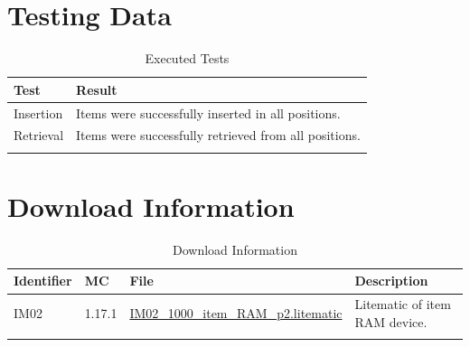 \documentclass[10pt]{datasheet}
\begin{document}
\section{Testing Data}

\begin{table}[h]
\caption{Executed Tests}
\begin{tabularx}{\textwidth}{l | X}
    \thickhline
    \textbf{Test} & \textbf{Result} \\
    \hline
    Insertion & Items were successfully inserted in all positions. \\
    \hline
    Retrieval & Items were successfully retrieved from all positions. \\
    \thickhline
\end{tabularx}
\end{table}

\section{Download Information}
\begin{table}[h]
    \caption{Download Information}
    \begin{tabularx}{\textwidth}{l | l | l | X}
        \thickhline
        \textbf{Identifier} & \textbf{MC} & \textbf{File} & \textbf{Description} \\
        \hline
        IM02 & 1.17.1 & \href{https://github.com/Soontech-Annals/Archive/blob/92d3541e07ddc3ab90360e923907f040eca76834/Archive/item-memory/IM02\%201000\%20Item\%20RAM/IM02\_1000\_item\_RAM\_p2.litematic?raw=1}{IM02\_1000\_item\_RAM\_p2.litematic} & Litematic of item RAM device. \\
        \thickhline
    \end{tabularx}
\end{table}
\end{document}
